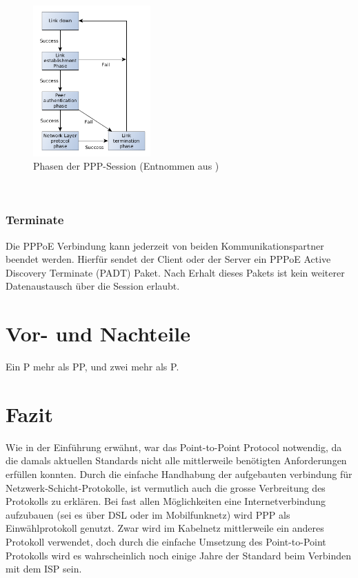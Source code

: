 \documentclass[journal,11pt]{IEEEtran}
\begin{document}
\begin{figure}[h!]
 \centering
  \includegraphics[width=0.4\textwidth]{img/ppp_linkstates.png}
 \caption{Phasen der PPP-Session (Entnommen aus \cite{ppp_oracle})}
 \label{fig:ppp_oracle_ablauf}
\end{figure}
%
\\
\subsubsection{Terminate}
Die PPPoE Verbindung kann jederzeit von beiden Kommunikationspartner beendet werden. Hierfür sendet
der Client oder der Server ein PPPoE Active Discovery Terminate (PADT) Paket. Nach Erhalt dieses
Pakets ist kein weiterer Datenaustausch über die Session erlaubt.
\\
%
\section{Vor- und Nachteile} 
%
Ein P mehr als PP, und zwei mehr als P.
\\
%
\section{Fazit} 
Wie in der Einf\"uhrung erw\"ahnt, war das Point-to-Point Protocol notwendig, da die damals aktuellen Standards nicht alle mittlerweile ben\"otigten Anforderungen erf\"ullen konnten. Durch die einfache Handhabung der aufgebauten verbindung f\"ur Netzwerk-Schicht-Protokolle, ist vermutlich auch die grosse Verbreitung des Protokolls zu erkl\"aren. Bei fast allen M\"oglichkeiten eine Internetverbindung aufzubauen (sei es \"uber DSL oder im Mobilfunknetz) wird PPP als Einw\"ahlprotokoll genutzt. Zwar wird im Kabelnetz mittlerweile ein anderes Protokoll verwendet, doch durch die einfache Umsetzung des Point-to-Point Protokolls wird es wahrscheinlich noch einige Jahre der Standard beim Verbinden mit dem ISP sein.
\end{document}
